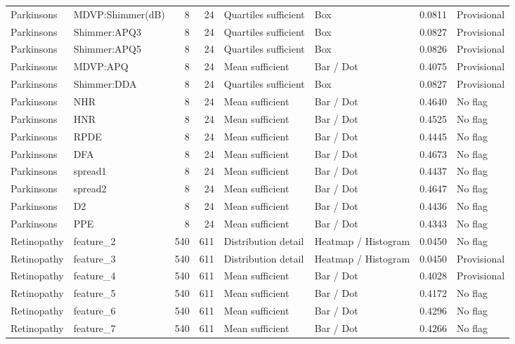 \begin{longtable}{>{\raggedright\arraybackslash}p{2.5cm}>{\raggedright\arraybackslash}p{4.5cm}rr>{\raggedright\arraybackslash}p{3.0cm}>{\raggedright\arraybackslash}p{4.0cm}rp{2.0cm}}
Parkinsons\cite{parkinsons} & MDVP:Shimmer(dB) & 8 & 24 & Quartiles sufficient & Box & 0.0811 & Provisional\\
Parkinsons\cite{parkinsons} & Shimmer:APQ3 & 8 & 24 & Quartiles sufficient & Box & 0.0827 & Provisional\\
Parkinsons\cite{parkinsons} & Shimmer:APQ5 & 8 & 24 & Quartiles sufficient & Box & 0.0826 & Provisional\\
Parkinsons\cite{parkinsons} & MDVP:APQ & 8 & 24 & Mean sufficient & Bar / Dot & 0.4075 & Provisional\\
Parkinsons\cite{parkinsons} & Shimmer:DDA & 8 & 24 & Quartiles sufficient & Box & 0.0827 & Provisional\\
Parkinsons\cite{parkinsons} & NHR & 8 & 24 & Mean sufficient & Bar / Dot & 0.4640 & No flag\\
Parkinsons\cite{parkinsons} & HNR & 8 & 24 & Mean sufficient & Bar / Dot & 0.4525 & No flag\\
Parkinsons\cite{parkinsons} & RPDE & 8 & 24 & Mean sufficient & Bar / Dot & 0.4445 & No flag\\
Parkinsons\cite{parkinsons} & DFA & 8 & 24 & Mean sufficient & Bar / Dot & 0.4673 & No flag\\
Parkinsons\cite{parkinsons} & spread1 & 8 & 24 & Mean sufficient & Bar / Dot & 0.4437 & No flag\\
Parkinsons\cite{parkinsons} & spread2 & 8 & 24 & Mean sufficient & Bar / Dot & 0.4647 & No flag\\
Parkinsons\cite{parkinsons} & D2 & 8 & 24 & Mean sufficient & Bar / Dot & 0.4436 & No flag\\
Parkinsons\cite{parkinsons} & PPE & 8 & 24 & Mean sufficient & Bar / Dot & 0.4343 & No flag\\
Retinopathy\cite{retina} & feature\_2 & 540 & 611 & Distribution detail & Heatmap / Histogram & 0.0450 & No flag\\
Retinopathy\cite{retina} & feature\_3 & 540 & 611 & Distribution detail & Heatmap / Histogram & 0.0450 & Provisional\\
Retinopathy\cite{retina} & feature\_4 & 540 & 611 & Mean sufficient & Bar / Dot & 0.4028 & Provisional\\
Retinopathy\cite{retina} & feature\_5 & 540 & 611 & Mean sufficient & Bar / Dot & 0.4172 & No flag\\
Retinopathy\cite{retina} & feature\_6 & 540 & 611 & Mean sufficient & Bar / Dot & 0.4296 & No flag\\
Retinopathy\cite{retina} & feature\_7 & 540 & 611 & Mean sufficient & Bar / Dot & 0.4266 & No flag\\

\end{longtable}
